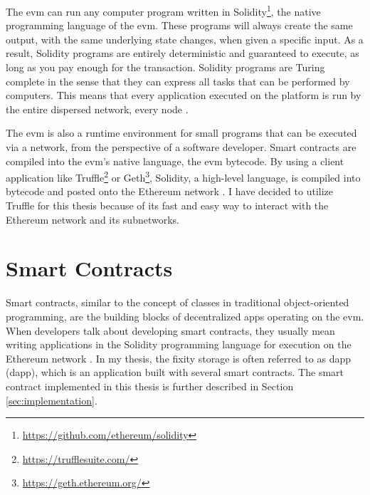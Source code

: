 \documentclass[final]{vutinfth}
\begin{document}
The \acrshort{evm} can run any computer program written in Solidity\footnote{\url{https://github.com/ethereum/solidity}}, the native programming language of the \acrshort{evm}. These programs will always create the same output, with the same underlying state changes, when given a specific input. As a result, Solidity programs are entirely deterministic and guaranteed to execute, as long as you pay enough for the transaction. Solidity programs are Turing complete in the sense that they can express all tasks that can be performed by computers. This means that every application executed on the platform is run by the entire dispersed network, every node \cite[50]{dannen2017introducing}.

The \acrshort{evm} is also a runtime environment for small programs that can be executed via a network, from the perspective of a software developer. Smart contracts are compiled into the \acrshort{evm}'s native language, the \acrshort{evm} bytecode. By using a client application like Truffle\footnote{\url{https://trufflesuite.com/}} or Geth\footnote{\url{https://geth.ethereum.org/}}, Solidity, a high-level language, is compiled into bytecode and posted onto the Ethereum network \cite[51]{dannen2017introducing}. I have decided to utilize Truffle for this thesis because of its fast and easy way to interact with the Ethereum network and its subnetworks.
\section{Smart Contracts}
Smart contracts, similar to the concept of classes in traditional object-oriented programming, are the building blocks of decentralized apps operating on the \acrshort{evm}. When developers talk about developing smart contracts, they usually mean writing applications in the Solidity programming language for execution on the Ethereum network \cite[10]{dannen2017introducing}.
In my thesis, the fixity storage is often referred to as \acrlong{dapp} (\acrshort{dapp}), which is an application built with several smart contracts. The smart contract implemented in this thesis is further described in Section \ref{sec:implementation}. 
\end{document}
